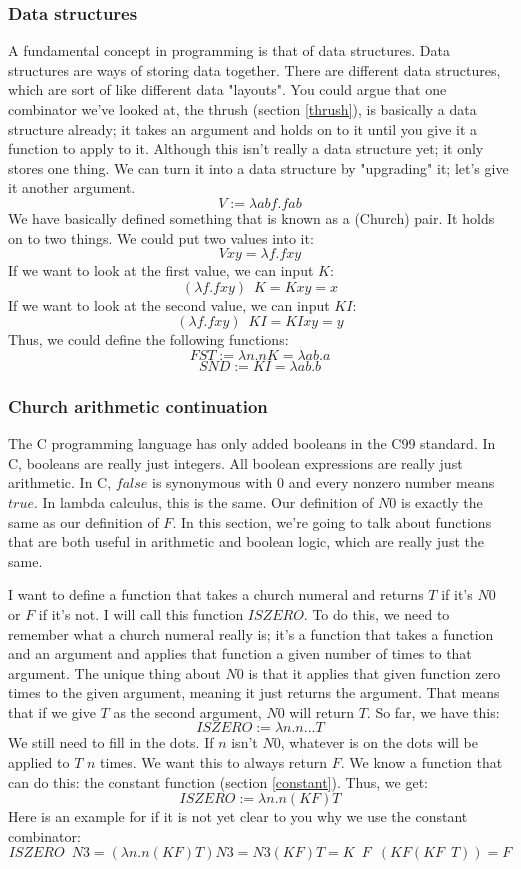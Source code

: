 \documentclass[11pt]{article}
\begin{document}
\subsubsection{Data structures}

A fundamental concept in programming is that of data structures. Data
structures are ways of storing data together. There are different data
structures, which are sort of like different data "layouts". You could argue
that one combinator we've looked at, the thrush (section \ref{thrush}), is
basically a data structure already; it takes an argument and holds on to it
until you give it a function to apply to it. Although this isn't really a data
structure yet; it only stores one thing. We can turn it into a data structure
by "upgrading" it; let's give it another argument.
\[V:=\lambda abf.fab\]
We have basically defined something that is known as a (Church) pair. It holds
on to two things. We could put two values into it:
\[Vxy=\lambda f.fxy\]
If we want to look at the first value, we can input \(K\):
\[(\lambda f.fxy)\enspace K=Kxy=x\]
If we want to look at the second value, we can input \(KI\):
\[(\lambda f.fxy)\enspace KI=KIxy=y\]
Thus, we could define the following functions:
\[FST:=\lambda n.nK=\lambda ab.a\]
\[SND:=KI=\lambda ab.b\]

\subsubsection{Church arithmetic continuation}

The C programming language has only added booleans in the C99 standard. In C,
booleans are really just integers. All boolean expressions are really just
arithmetic. In C, \(false\) is synonymous with \(0\) and every nonzero number
means \(true\). In lambda calculus, this is the same. Our definition of \(N0\)
is exactly the same as our definition of \(F\). In this section, we're going to
talk about functions that are both useful in arithmetic and boolean logic,
which are really just the same.

I want to define a function that takes a church numeral and returns \(T\) if
it's \(N0\) or \(F\) if it's not. I will call this function \(ISZERO\). To do
this, we need to remember what a church numeral really is; it's a function that
takes a function and an argument and applies that function a given number of
times to that argument. The unique thing about \(N0\) is that it applies that
given function zero times to the given argument, meaning it just returns the
argument. That means that if we give \(T\) as the second argument, \(N0\) will
return \(T\). So far, we have this:
\[ISZERO:=\lambda n.n...T\]
We still need to fill in the dots. If \(n\) isn't \(N0\), whatever is on the
dots will be applied to \(T\) \(n\) times. We want this to always return \(F\).
We know a function that can do this: the constant function (section
\ref{constant}). Thus, we get:
\[ISZERO:=\lambda n.n(KF)T\]
Here is an example for if it is not yet clear to you why we use the constant
combinator:
\[ISZERO\enspace N3=(\lambda n.n(KF)T)N3=N3(KF)T=K\enspace F\enspace (KF(KF\enspace T))=F\]
\end{document}
